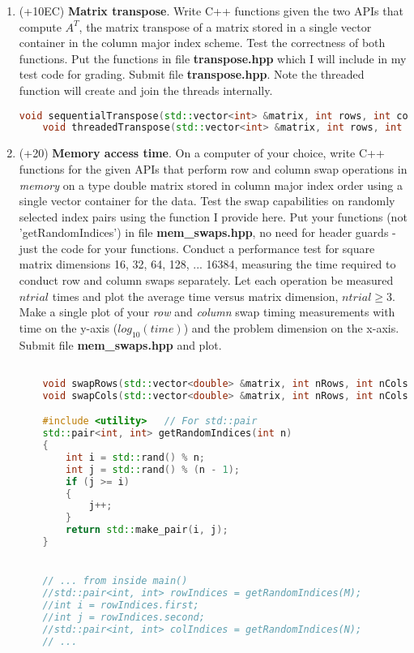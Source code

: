 \documentclass[10pt]{article}
\theoremstyle{definition}
\theoremstyle{remark}
\begin{document}
\begin{enumerate}
    \item (+10EC) \textbf{Matrix transpose}. Write C++ functions given the two APIs that compute $A^T$, the matrix transpose of a matrix stored in a single vector container in the column major index scheme. Test the correctness of both functions. Put the functions in file \textbf{transpose.hpp} which I will include in my test code for grading. Submit file \textbf{transpose.hpp}. Note the threaded function will create and join the threads internally. 
    \begin{lstlisting}[language=C++]
    void sequentialTranspose(std::vector<int> &matrix, int rows, int cols);
    void threadedTranspose(std::vector<int> &matrix, int rows, int cols, int nthreads);
    \end{lstlisting}

    \item (+20) \textbf{Memory access time}. On a computer of your choice, write C++ functions for the given APIs that perform row and column swap operations in \textit{memory} on a type double matrix stored in column major index order using a single vector container for the data. Test the swap capabilities on randomly selected index pairs using the function I provide here. Put your functions (not 'getRandomIndices') in file \textbf{mem\_swaps.hpp}, no need for header guards -just the code for your functions. Conduct a performance test for square matrix dimensions 16, 32, 64, 128, ... 16384, measuring the time required to conduct row and column swaps separately. Let each operation be measured $ntrial$ times and plot the average time versus matrix dimension, $ntrial\geq 3$. Make a single plot of your \textit{row} and \textit{column} swap timing measurements with time on the y-axis ($log_{10}(time)$) and the problem dimension on the x-axis. Submit file \textbf{mem\_swaps.hpp} and plot. 
    \begin{lstlisting}[language=C++]

    void swapRows(std::vector<double> &matrix, int nRows, int nCols, int i, int j);
    void swapCols(std::vector<double> &matrix, int nRows, int nCols, int i, int j);

    #include <utility>   // For std::pair
    std::pair<int, int> getRandomIndices(int n)
    {
        int i = std::rand() % n;
        int j = std::rand() % (n - 1);
        if (j >= i)
        {
            j++;
        }
        return std::make_pair(i, j);
    }


    // ... from inside main()
    //std::pair<int, int> rowIndices = getRandomIndices(M);
    //int i = rowIndices.first;
    //int j = rowIndices.second;
    //std::pair<int, int> colIndices = getRandomIndices(N);
    // ...


\end{lstlisting}
\end{enumerate}
\end{document}
